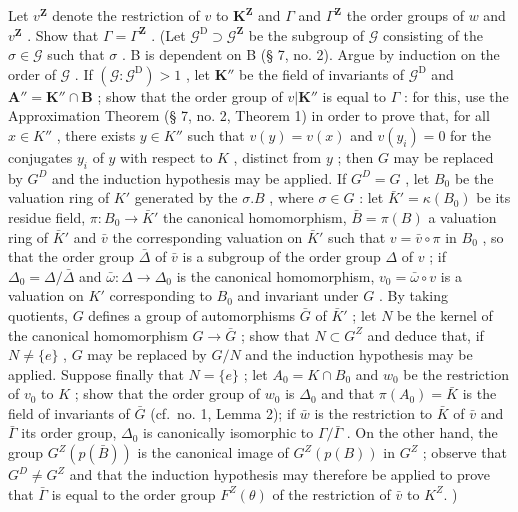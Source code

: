 \begin{enumerate}
  Let \(v^{\mathbf{Z}}\) denote the restriction of \(v\) to \(\mathbf{K}^{\mathbf{Z}}\) and \(\Gamma\) and \(\Gamma^{\mathbf{Z}}\) the order groups of \(w\) and \(v^{\mathbf{Z}}\) . Show that \(\Gamma = \Gamma^{\mathbf{Z}}\) . (Let \(\mathcal{G}^{\mathrm{D}} \supset \mathcal{G}^{\mathbf{Z}}\) be the subgroup of \(\mathcal{G}\) consisting of the \(\sigma \in \mathcal{G}\) such that \(\sigma\) . B is dependent on B (§ 7, no. 2). Argue by induction on the order of \(\mathcal{G}\) . If \((\mathcal{G}: \mathcal{G}^{\mathrm{D}}) > 1\) , let \(\mathbf{K}''\) be the field of invariants of \(\mathcal{G}^{\mathrm{D}}\) and \(\mathbf{A}'' = \mathbf{K}'' \cap \mathbf{B}\) ; show that the order group of \(v|\mathbf{K}''\) is equal to \(\Gamma\) : for this, use the Approximation Theorem (§ 7, no. 2, Theorem 1) in order to prove that, for all \(x \in K''\) , there exists \(y \in K''\) such that \(v(y) = v(x)\) and \(v(y_i) = 0\) for the conjugates \(y_i\) of \(y\) with respect to \(K\) , distinct from \(y\) ; then \(G\) may be replaced by \(G^D\) and the induction hypothesis may be applied. If \(G^D = G\) , let \(B_0\) be the valuation ring of \(K'\) generated by the \(\sigma.B\) , where \(\sigma \in G\) : let \(\bar{K}' = \kappa(B_0)\) be its residue field, \(\pi: B_0 \to \bar{K}'\) the canonical homomorphism, \(\bar{B} = \pi(B)\) a valuation ring of \(\bar{K}'\) and \(\bar{v}\) the corresponding valuation on \(\bar{K}'\) such that \(v = \bar{v} \circ \pi\) in \(B_0\) , so that the order group \(\bar{\Delta}\) of \(\bar{v}\) is a subgroup of the order group \(\Delta\) of \(v\) ; if \(\Delta_0 = \Delta/\bar{\Delta}\) and \(\bar{\omega}: \Delta \to \Delta_0\) is the canonical homomorphism, \(v_0 = \bar{\omega} \circ v\) is a valuation on \(K'\) corresponding to \(B_0\) and invariant under \(G\) . By taking quotients, \(G\) defines a group of automorphisms \(\bar{G}\) of \(\bar{K}'\) ; let \(N\) be the kernel of the canonical homomorphism \(G \to \bar{G}\) ; show that \(N \subset G^Z\) and deduce that, if \(N \neq \{e\}\) , \(G\) may be replaced by \(G/N\) and the induction hypothesis may be applied. Suppose finally that \(N = \{e\}\) ; let \(A_0 = K \cap B_0\) and \(w_0\) be the restriction of \(v_0\) to \(K\) ; show that the order group of \(w_0\) is \(\Delta_0\) and that \(\pi(A_0) = \bar{K}\) is the field of invariants of \(\bar{G}\) (cf.~no. 1, Lemma 2); if \(\bar{w}\) is the restriction to \(\bar{K}\) of \(\bar{v}\) and \(\bar{\Gamma}\) its order group, \(\Delta_0\) is canonically isomorphic to \(\Gamma/\bar{\Gamma}\) . On the other hand, the group \(G^Z(p(\bar{B}))\) is the canonical image of \(G^Z(p(B))\) in \(G^Z\) ; observe that \(G^D \neq G^Z\) and that the induction hypothesis may therefore be applied to prove that \(\bar{\Gamma}\) is equal to the order group \(F^Z(θ)\) of the restriction of \(\bar{v}\) to \(K^Z\). )

\end{enumerate}
